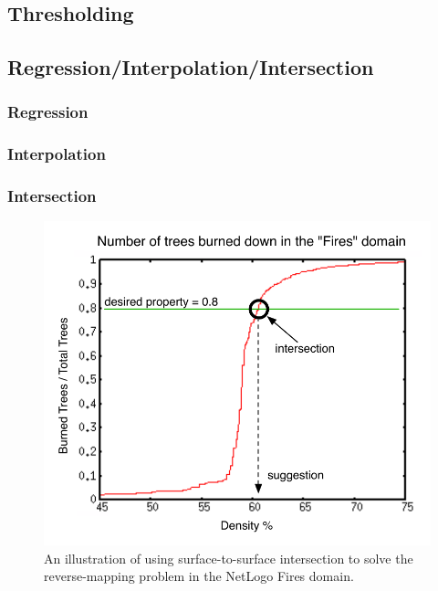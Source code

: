 \subsection{Thresholding}

\subsection{Regression/Interpolation/Intersection}

\subsubsection{Regression}


\subsubsection{Interpolation}

\subsubsection{Intersection}


\begin{figure}[ht]
\centering
\includegraphics[scale=.66666667]{images/firespace-intersection.pdf}
\caption{An illustration of using surface-to-surface intersection to solve the reverse-mapping problem in the NetLogo Fires domain.}
\label{fig:fires-inter}
\end{figure}




